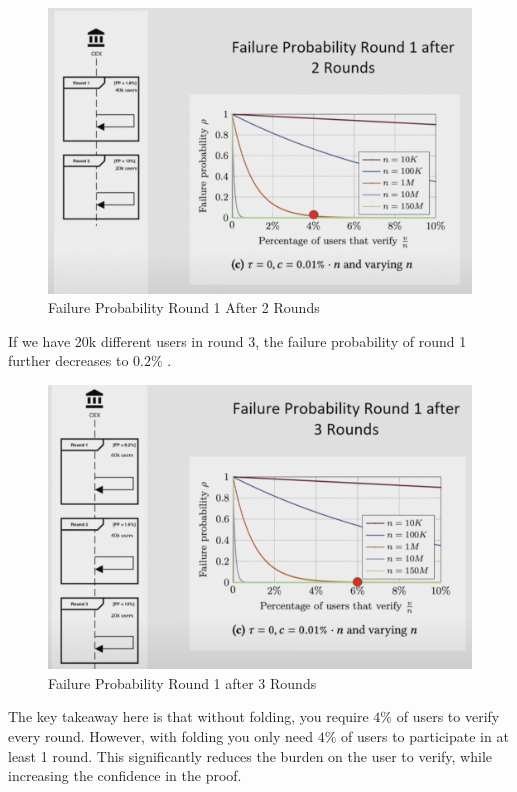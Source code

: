 \begin{figure}[H]
   \centering
   \includegraphics[width=130mm]{FailureProbabilityRound2.png}
   \caption{Failure Probability Round 1 After 2 Rounds\cite{NS23}}
   \label{overflow}
   \end{figure}

If we have 20k different users in round 3, the failure probability of round 1 further decreases to $0.2\%$ .

\begin{figure}[H]
   \centering
   \includegraphics[width=130mm]{FailureProbabilityRound3.png}
   \caption{Failure Probability Round 1 after 3 Rounds \cite{NS23}}
   \label{overflow}
   \end{figure}
The key takeaway here is that without folding, you require $4\%$ of users to verify every round. However, with folding you only need
$4\%$  of users to participate in at least 1 round. This significantly reduces the burden on the user to verify, while increasing the confidence in the proof.


